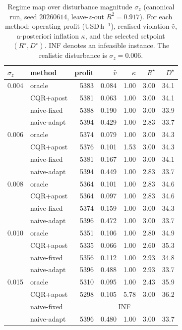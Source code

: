 \documentclass[review,times]{elsarticle}
\begin{document}
\begin{table}[t]
\centering
\caption{Regime map over disturbance magnitude $\sigma_z$ (canonical run, seed $20260614$,
leave-$z$-out $R^2=0.917$). For each method: operating profit (USD\,h$^{-1}$), realised violation
$\hat v$, a-posteriori inflation $\kappa$, and the selected setpoint $(R^\star,D^\star)$. INF
denotes an infeasible instance. The realistic disturbance is $\sigma_z=0.006$.}
\label{tab:regime}
\footnotesize
\begin{tabular}{llrrrrr}
\toprule
$\sigma_z$ & method & profit & $\hat v$ & $\kappa$ & $R^\star$ & $D^\star$ \\
\midrule
0.004 & oracle      & 5383 & 0.084 & 1.00 & 3.00 & 34.1 \\
      & CQR+apost   & 5381 & 0.063 & 1.00 & 3.00 & 34.1 \\
      & naive-fixed & 5388 & 0.190 & 1.00 & 3.00 & 33.9 \\
      & naive-adapt & 5394 & 0.429 & 1.00 & 2.83 & 33.7 \\
\midrule
0.006 & oracle      & 5374 & 0.079 & 1.00 & 3.00 & 34.3 \\
      & CQR+apost   & 5376 & 0.101 & 1.53 & 3.00 & 34.3 \\
      & naive-fixed & 5381 & 0.167 & 1.00 & 3.00 & 34.1 \\
      & naive-adapt & 5394 & 0.449 & 1.00 & 2.83 & 33.7 \\
\midrule
0.008 & oracle      & 5364 & 0.101 & 1.00 & 2.83 & 34.6 \\
      & CQR+apost   & 5364 & 0.097 & 1.00 & 2.83 & 34.6 \\
      & naive-fixed & 5374 & 0.159 & 1.00 & 3.00 & 34.3 \\
      & naive-adapt & 5396 & 0.472 & 1.00 & 3.00 & 33.7 \\
\midrule
0.010 & oracle      & 5351 & 0.106 & 1.00 & 2.80 & 34.9 \\
      & CQR+apost   & 5335 & 0.066 & 1.00 & 2.60 & 35.3 \\
      & naive-fixed & 5356 & 0.112 & 1.00 & 2.93 & 34.8 \\
      & naive-adapt & 5396 & 0.488 & 1.00 & 2.93 & 33.7 \\
\midrule
0.015 & oracle      & 5310 & 0.095 & 1.00 & 2.43 & 35.9 \\
      & CQR+apost   & 5298 & 0.105 & 5.78 & 3.00 & 36.2 \\
      & naive-fixed & \multicolumn{5}{c}{INF} \\
      & naive-adapt & 5396 & 0.480 & 1.00 & 3.00 & 33.7 \\

\end{tabular}
\end{table}
\end{document}

